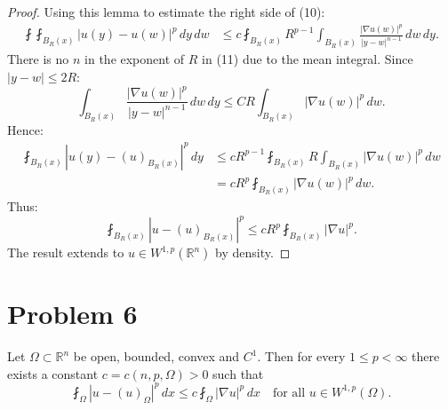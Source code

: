\begin{proof}
Using this lemma to estimate the right side of (10):
\begin{align}
\fint \fint_{B_R(x)} |u(y) -u(w)|^p \, dy \, dw
&\le c\fint_{B_R(x)} R^{p-1} \int_{B_R(x)} \frac{|\nabla u(w)|^p}{|y-w|^{n-1}}\, dw \, dy.
\end{align}
There is no $n$ in the exponent of $R$ in (11) due to the mean integral. Since $|y-w| \le 2R$:
\[
\int_{B_R(x)} \frac{|\nabla u(w)|^p}{|y-w|^{n-1}}\, dw \, dy \le C R \int_{B_R(x)} |\nabla u(w)|^p \, dw.
\]
Hence:
\begin{align}
    \fint_{B_R(x)} |u(y) - (u)_{B_R(x)}|^p \, dy
    &\le c R^{p-1} \fint_{B_R(x)} R \int_{B_R(x)} |\nabla u(w)|^p \, dw \\
    &= c R^p \fint_{B_R(x)} |\nabla u(w)|^p \, dw.
\end{align}
Thus:
\[
\boxed{
\fint_{B_R(x)} \left|u - (u)_{B_R(x)}\right |^p \le cR^p \fint_{B_R(x)} |\nabla u|^p.
}
\]
The result extends to $u\in W^{1,p}(\mathbb{R}^n)$ by density.
\end{proof}

\section{Problem 6}
\begin{theorem}
Let $\Omega \subset \mathbb{R}^n$ be open, bounded, convex and $C^1$.  
Then for every $1 \le p < \infty$ there exists a constant 
$c = c(n,p,\Omega) > 0$ such that
\[
\fint_\Omega |u-(u)_\Omega|^p \, dx 
\le c \fint_\Omega |\nabla u|^p \, dx
\quad \text{for all } u \in W^{1,p}(\Omega).
\]
\end{theorem}

